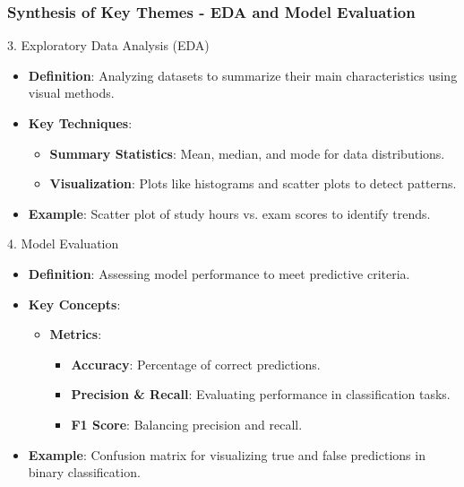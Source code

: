 \documentclass[aspectratio=169]{beamer}
\begin{document}
\begin{frame}[fragile]
    \frametitle{Synthesis of Key Themes - EDA and Model Evaluation}
    \begin{block}{3. Exploratory Data Analysis (EDA)}
        \begin{itemize}
            \item \textbf{Definition}: Analyzing datasets to summarize their main characteristics using visual methods.
            \item \textbf{Key Techniques}:
                \begin{itemize}
                    \item \textbf{Summary Statistics}: Mean, median, and mode for data distributions.
                    \item \textbf{Visualization}: Plots like histograms and scatter plots to detect patterns.
                \end{itemize}
            \item \textbf{Example}: Scatter plot of study hours vs. exam scores to identify trends.
        \end{itemize}
    \end{block}
    
    \begin{block}{4. Model Evaluation}
        \begin{itemize}
            \item \textbf{Definition}: Assessing model performance to meet predictive criteria.
            \item \textbf{Key Concepts}:
                \begin{itemize}
                    \item \textbf{Metrics}:
                        \begin{itemize}
                            \item \textbf{Accuracy}: Percentage of correct predictions.
                            \item \textbf{Precision \& Recall}: Evaluating performance in classification tasks.
                            \item \textbf{F1 Score}: Balancing precision and recall.
                        \end{itemize}
                \end{itemize}
            \item \textbf{Example}: Confusion matrix for visualizing true and false predictions in binary classification.
        \end{itemize}
    \end{block}
\end{frame}
\end{document}
